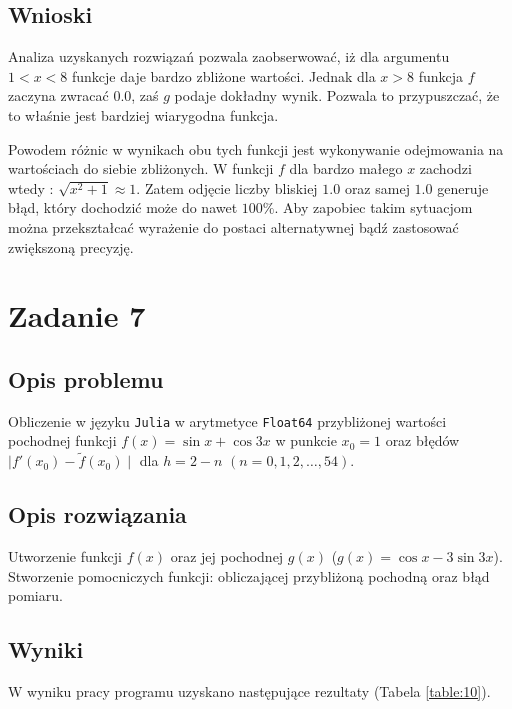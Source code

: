 \documentclass{classrep}
\begin{document}
	\subsection{Wnioski}
		Analiza uzyskanych rozwiązań pozwala zaobserwować, iż dla argumentu $1<x<8$ funkcje daje bardzo 
		zbliżone wartości. Jednak dla $x>8$ funkcja $f$ zaczyna zwracać $0.0$, zaś $g$ podaje dokładny wynik. 
		Pozwala to przypuszczać, że to właśnie jest bardziej wiarygodna funkcja.
		
		Powodem różnic w wynikach obu tych funkcji jest wykonywanie odejmowania na wartościach do siebie zbliżonych.
		W funkcji $f$ dla bardzo małego $x$ zachodzi wtedy :
		$\sqrt{x^{2}+1} \approx 1$. Zatem odjęcie liczby bliskiej $1.0$ oraz samej $1.0$ generuje błąd, który dochodzić może do nawet $100\%$. Aby zapobiec takim sytuacjom można przekształcać wyrażenie do postaci alternatywnej bądź zastosować 
		zwiększoną precyzję.
\section{Zadanie 7}
	\subsection{Opis problemu}
		Obliczenie w języku \texttt{Julia} w arytmetyce \texttt{Float64} przybliżonej wartości pochodnej funkcji
		$f(x)=\sin{x}+\cos{3x}$ w punkcie $x_0=1$ oraz błędów $\mid f'(x_0)-\tilde{f}(x_0) \mid$ dla 
		$h=2-n$ $(n=0,1,2,\dots,54)$.
	\subsection{Opis rozwiązania}
		Utworzenie funkcji $f(x)$ oraz jej pochodnej $g(x)$ ($g(x)=\cos{x}-3\sin{3x}$). Stworzenie 
		pomocniczych funkcji: obliczającej przybliżoną pochodną oraz błąd pomiaru.
	\subsection{Wyniki}
		W wyniku pracy programu uzyskano następujące rezultaty (Tabela \ref{table:10}).
		
\end{document}
